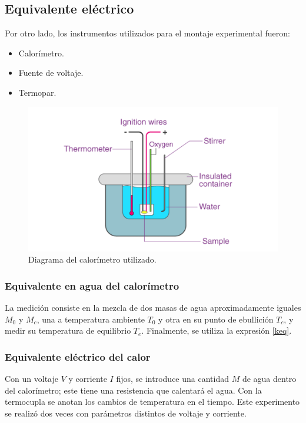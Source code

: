 \documentclass{article}
\begin{document}
\subsection{Equivalente eléctrico}
Por otro lado, los instrumentos utilizados para el montaje experimental fueron:

\begin{itemize}
    \item Calorímetro.
    \item Fuente de voltaje.
    \item Termopar. 
\end{itemize}

\begin{figure}[H]
    \centering
    \includegraphics[scale=0.2]{calorimetro.png}
    \caption{Diagrama del calorímetro utilizado.}
    \label{fig:calorimetro}
\end{figure}

\subsubsection{Equivalente en agua del calorímetro}
La medición consiste en la mezcla de dos masas de agua aproximadamente iguales $M_0$ y $M_c$, una a temperatura ambiente $T_0$ y otra en su punto de ebullición $T_c$, y medir su temperatura de equilibrio $T_e$. Finalmente, se utiliza la expresión \ref{keq}.

\subsubsection{Equivalente eléctrico del calor}
Con un voltaje $V$ y corriente $I$ fijos, se introduce una cantidad $M$ de agua dentro del calorímetro; este tiene una resistencia que calentará el agua. Con la termocupla se anotan los cambios de temperatura en el tiempo. Este experimento se realizó dos veces con parámetros distintos de voltaje y corriente.
\end{document}
